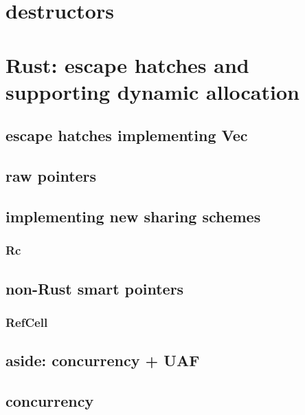 

\section{destructors}


\section{Rust: escape hatches and supporting dynamic allocation}


\subsection{escape hatches implementing Vec}


\subsection{raw pointers}



\subsection{implementing new sharing schemes}
\subsubsection{Rc}


\subsection{non-Rust smart pointers}


\subsubsection{RefCell}


\subsection{aside: concurrency + UAF}


\subsection{concurrency}


